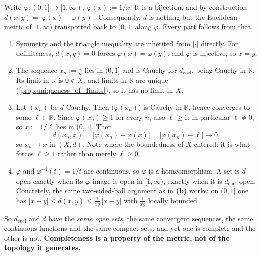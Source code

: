 \begin{exercisesolution}
\label{sol:completeness_not_topological}
Write $\varphi : (0,1] \to [1,\infty)$, $\varphi(x) := 1/x$. It is a bijection, and by
construction $d(x,y) = |\varphi(x)-\varphi(y)|$. Consequently, $d$ is nothing but the Euclidean
metric of $[1,\infty)$ transported back to $(0,1]$ along $\varphi$. Every part follows from that.

\begin{enumerate}[label=\textbf{(\alph*)}]
  \item Symmetry and the triangle inequality are inherited from $|\cdot|$ directly. For
    definiteness, $d(x,y)=0$ forces $\varphi(x)=\varphi(y)$, and $\varphi$ is injective, so
    $x=y$.
  \item The sequence $x_n := \tfrac1n$ lies in $(0,1]$ and is Cauchy for
    $d_{\text{eucl}}$, being Cauchy in $\mathbb{R}$. Its limit in $\mathbb{R}$ is $0 \notin X$,
    and limits in $\mathbb{R}$ are unique (\cref{prop:uniqueness_of_limits}), so it has no limit
    in $X$.
  \item Let $(x_n)$ be $d$-Cauchy. Then $\big(\varphi(x_n)\big)$ is Cauchy in $\mathbb{R}$,
    hence converges to some $\ell \in \mathbb{R}$. Since $\varphi(x_n) \geq 1$ for every $n$,
    also $\ell \geq 1$; in particular $\ell \neq 0$, so $x := 1/\ell$ lies in $(0,1]$. Then
    \[d(x_n,x) = \big|\varphi(x_n) - \varphi(x)\big| = \big|\varphi(x_n)-\ell\big|
      \longrightarrow 0,\]
    so $x_n \to x$ in $(X,d)$. Note where the boundedness of $X$ entered: it is what forces
    $\ell \geq 1$ rather than merely $\ell \geq 0$.
  \item $\varphi$ and $\varphi^{-1}(t) = 1/t$ are continuous, so $\varphi$ is a
    homeomorphism. A set is $d$-open exactly when its $\varphi$-image is open in $[1,\infty)$,
    exactly when it is $d_{\text{eucl}}$-open. Concretely, the same two-sided-ball argument as in
    \textbf{(b)} works: on $(0,1]$ one has
    $|x-y| \leq d(x,y) \leq \tfrac{1}{x y}\,|x-y|$ with $\tfrac{1}{xy}$ locally bounded.
\end{enumerate}

\begin{remark}
So $d_{\text{eucl}}$ and $d$ have the \emph{same open sets}, the same convergent sequences, the
same continuous functions and the same compact sets, and yet one is complete and the other is
not. \textbf{Completeness is a property of the metric, not of the topology it generates.}


\end{remark}
\end{exercisesolution}
